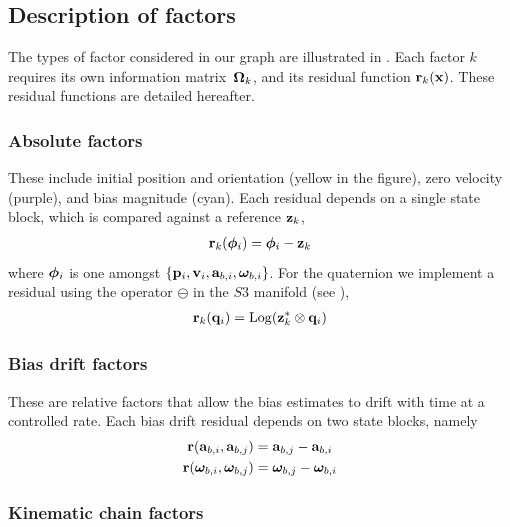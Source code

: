 \subsection{Description of factors}

The types of factor considered in our graph are illustrated in . 
Each factor $k$ requires its own information matrix~${\bm \Omega}_k$, and its residual function ${\bf r}_k({\bf x})$. These residual functions are detailed hereafter.

\subsubsection{Absolute factors}

These include initial position and orientation (yellow in the figure), zero velocity (purple), and bias magnitude (cyan). Each residual depends on a single state block, which is compared against a reference ${\bf z}_k$,
%
\begin{align}
{\bf r}_k({\bm \phi}_i) = {\bm \phi}_i - {\bf z}_k
\end{align}
%
where ${\bm \phi}_i$ is one amongst $\{{\bf p}_i,{\bf v}_i,{\bf a}_{b,i},{{\bm \omega}}_{b,i}\}$. 
For the quaternion we implement a residual using the operator $\ominus$ in the $S3$ manifold (see ),
%
\begin{align}
{\bf r}_k({\bf q}_i) = \operatorname*{Log}({\bf z}_k^*\otimes{\bf q}_i)
\end{align}
%

\subsubsection{Bias drift factors}

These are relative factors that allow the bias estimates to drift with time at a controlled rate. Each bias drift residual depends on two state blocks, namely
%
\begin{align}
\begin{split}
{\bf r}({\bf a}_{b,i}, {\bf a}_{b,j}) &= {\bf a}_{b,j} - {\bf a}_{b,i} 
\\
{\bf r}({{\bm \omega}}_{b,i} , {{\bm \omega}}_{b,j})  &= {{\bm \omega}}_{b,j}  - {{\bm \omega}}_{b,i}
\end{split}
\end{align}

\subsubsection{Kinematic chain factors}

